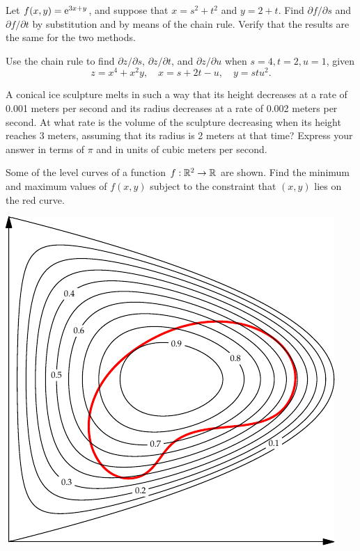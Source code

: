 \documentclass{watsonbook}
\begin{document}

\begin{aexercise}
  Let $f(x,y)=\operatorname{e}^{3x+y}$, and suppose that $x=s^2+t^2$ and
  $y=2+t$. Find $\partial f/\partial s$ and $\partial f/\partial t$ by
  substitution and by means of the chain rule. Verify that the results
  are the same for the two methods.
\end{aexercise}


\begin{aexercise}
  Use the chain rule to find $\partial z/\partial s$, $\partial
  z/\partial t$, and $\partial z/\partial u$ when $s=4, t = 2, u=1$, given 
  \[
    z = x^4 + x^2y, \quad x = s + 2t - u, \quad y = stu^2.
  \]
\end{aexercise}

\begin{aexercise}
  A conical ice sculpture melts in such a way that its height
  decreases at a rate of 0.001 meters per second and its radius
  decreases at a rate of 0.002 meters per second. At what rate is the
  volume of the sculpture decreasing when its height reaches 3 meters,
  assuming that its radius is 2 meters at that time? Express your
  answer in terms of $\pi$ and in units of cubic meters per second.
\end{aexercise}


\begin{aexercise}
  Some of the level curves of a function $f: \mathbb{R}^2 \to \mathbb{R}$ are
  shown. Find the minimum and maximum values of $f(x,y)$ subject to
  the constraint that $(x,y)$ lies on the red curve.
  \begin{center}
    \includegraphics{exercisefigures/lagrange_exercise} 
  \end{center}
\end{aexercise}
\end{document}
